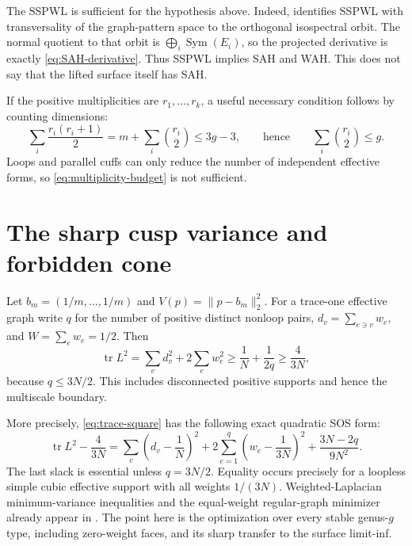 \documentclass[11pt,reqno]{amsart}
\theoremstyle{definition}
\theoremstyle{remark}
\newcommand{\tr}{\operatorname{tr}}
\newcommand{\Sym}{\operatorname{Sym}}
\begin{document}
The SSPWL is sufficient for the hypothesis above.  Indeed,
\cite[Proposition~2.9]{CFGL2026} identifies SSPWL with transversality of the
graph-pattern space to the orthogonal isospectral orbit.  The normal quotient
to that orbit is $\bigoplus_i\Sym(E_i)$, so the projected derivative is
exactly \eqref{eq:SAH-derivative}.  Thus SSPWL implies SAH and WAH.  This
does not say that the lifted surface itself has SAH.

If the positive multiplicities are $r_1,\ldots,r_k$, a useful necessary
condition follows by counting dimensions:
\begin{equation}\label{eq:multiplicity-budget}
 \sum_i\frac{r_i(r_i+1)}2
 =m+\sum_i\binom{r_i}{2}\le3g-3,
 \qquad\text{hence}\qquad
 \boxed{\sum_i\binom{r_i}{2}\le g.}
\end{equation}
Loops and parallel cuffs can only reduce the number of independent effective
forms, so \eqref{eq:multiplicity-budget} is not sufficient.

\section{The sharp cusp variance and forbidden cone}
\label{sec:cusp-gap}

Let $b_m=(1/m,\ldots,1/m)$ and $V(p)=\|p-b_m\|_2^2$.  For a trace-one
effective graph write $q$ for the number of positive distinct nonloop pairs,
$d_v=\sum_{e\ni v}w_e$, and $W=\sum_e w_e=1/2$.  Then
\begin{equation}\label{eq:trace-square}
 \tr L^2=\sum_vd_v^2+2\sum_ew_e^2
 \ge\frac1N+\frac1{2q}\ge\frac4{3N},
\end{equation}
because $q\le3N/2$.  This includes disconnected positive supports and hence
the multiscale boundary.

More precisely, \eqref{eq:trace-square} has the following exact quadratic
SOS form:
\begin{equation}\label{eq:sharp-SOS}
 \boxed{
 \tr L^2-\frac4{3N}
 =\sum_v\left(d_v-\frac1N\right)^2
  +2\sum_{e=1}^q\left(w_e-\frac1{3N}\right)^2
  +\frac{3N-2q}{9N^2}.}
\end{equation}
The last slack is essential unless $q=3N/2$.  Equality occurs precisely for
a loopless simple cubic effective support with all weights $1/(3N)$.
Weighted-Laplacian minimum-variance inequalities and the equal-weight
regular-graph minimizer already appear in \cite[Section~4]{FGL2025}.  The
point here is the optimization over every stable genus-$g$ type, including
zero-weight faces, and its sharp transfer to the surface limit-inf.
\end{document}
